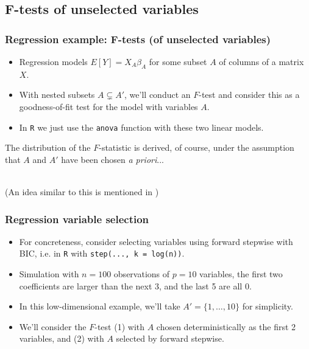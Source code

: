 \documentclass{beamer}
\begin{document}
\subsection{F-tests of unselected variables}

\begin{frame}
\frametitle{Regression example: F-tests (of unselected variables)}

\begin{itemize}
\item Regression models $E[Y] = X_A \beta_A$ for some subset $A$ of columns of a matrix $X$.
\item With nested subsets $A \subsetneq A'$, we'll conduct an $F$-test and consider this as a goodness-of-fit test for the model with variables $A$.
\item In \texttt{R} we just use the \texttt{anova} function with these two linear models.
\end{itemize}

The distribution of the $F$-statistic is derived, of course, under the assumption that $A$ and $A'$ have been chosen \textit{a priori}... \\

\ 

(An idea similar to this is mentioned in \cite{tian2015selective})
\end{frame}


\begin{frame}
\frametitle{Regression variable selection}

\begin{itemize}
\item For concreteness, consider selecting variables using forward stepwise with BIC, i.e. in \texttt{R} with \texttt{step(..., k = log(n))}.
\item Simulation with $n = 100$ observations of $p = 10$ variables, the first two coefficients are larger than the next 3, and the last 5 are all 0.
\item In this low-dimensional example, we'll take $A' = \{ 1, \ldots, 10 \}$ for simplicity.
\item We'll consider the $F$-test (1) with $A$ chosen deterministically as the first 2 variables, and (2) with $A$ selected by forward stepwise.
\end{itemize}
\end{frame}
\end{document}
